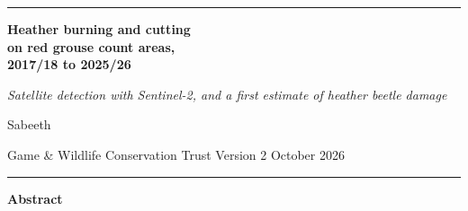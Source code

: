\documentclass[11pt,a4paper]{article}
\begin{document}
\begin{titlepage}
\raggedright
{\color{accent}\rule{\linewidth}{1.6pt}}\par\vspace{0.9cm}
{\fontsize{27}{34}\selectfont\bfseries\color{accent}Heather burning and cutting\\ on red grouse count areas,\\ 2017/18 to 2025/26\par}
\vspace{0.45cm}
{\Large\itshape\color{muted}Satellite detection with Sentinel-2, and a first estimate of heather beetle damage\par}
\vspace{0.7cm}
{\sffamily\large Sabeeth\par}
{\sffamily\normalsize\color{muted}Game \& Wildlife Conservation Trust \enspace\textbullet\enspace Version 2 \enspace\textbullet\enspace October 2026\par}
\vspace{0.6cm}
{\color{rulegrey}\rule{\linewidth}{0.5pt}}\par
\vspace{0.7cm}
\begin{tcolorbox}[enhanced,colback=accentlight,colframe=accentlight,arc=1.5pt,left=11pt,right=11pt,top=9pt,bottom=9pt]
{\sffamily\bfseries\color{accent}Abstract}\par\vspace{0.3em}
\small

\end{tcolorbox}
\end{titlepage}
\end{document}
